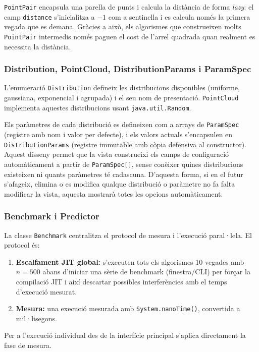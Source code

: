\documentclass[conference,compsoc]{IEEEtran}
\begin{document}
\texttt{PointPair} encapsula una parella de punts i calcula la
distància de forma \textit{lazy}: el camp
\texttt{distance} s'inicialitza a $-1$ com a sentinella i es calcula
només la primera vegada que es demana. Gràcies a això, els algorismes
que construeixen molts \texttt{PointPair} intermedis només paguen el
cost de l'arrel quadrada quan realment es necessita la distància.

\subsubsection{Distribution, PointCloud, DistributionParams i ParamSpec}

L'enumeració \texttt{Distribution} defineix les distribucions disponibles
(uniforme, gaussiana, exponencial i agrupada) i el seu nom de presentació.
\texttt{PointCloud} implementa aquestes distribucions usant
\texttt{java.util.Random}.

Els paràmetres de cada distribució es defineixen com a arrays de
\texttt{ParamSpec} (registre amb nom i valor per defecte), i els
valors actuals s'encapsulen en \texttt{DistributionParams} (registre
immutable amb còpia defensiva al constructor). Aquest disseny permet
que la vista construeixi els camps de configuració automàticament
a partir de \texttt{ParamSpec[]}, sense conèixer quines distribucions
existeixen ni quants paràmetres té cadascuna. D'aquesta forma, si en el
futur s'afageix, elimina o es modifica qualque distribució o paràmetre
no fa falta modificar la vista, aquesta mostrarà totes les opcions automàticament.

\subsubsection{Benchmark i Predictor}
\label{sec:benchmark}

La classe \texttt{Benchmark} centralitza el protocol de mesura i
l'execució paral·lela. El protocol és:

\begin{enumerate}
    \item \textbf{Escalfament JIT global:} s'executen tots els algorismes
          10 vegades amb $n = 500$ abans d'iniciar una sèrie de benchmark
          (finestra/CLI) per forçar la compilació JIT i així descartar possibles
          interferències amb el temps d'execució mesurat.
    \item \textbf{Mesura:} una execució mesurada amb
          \texttt{System.nanoTime()}, convertida a mil·lisegons.
\end{enumerate}
Per a l'execució individual des de la interfície principal s'aplica
directament la fase de mesura.
\end{document}
